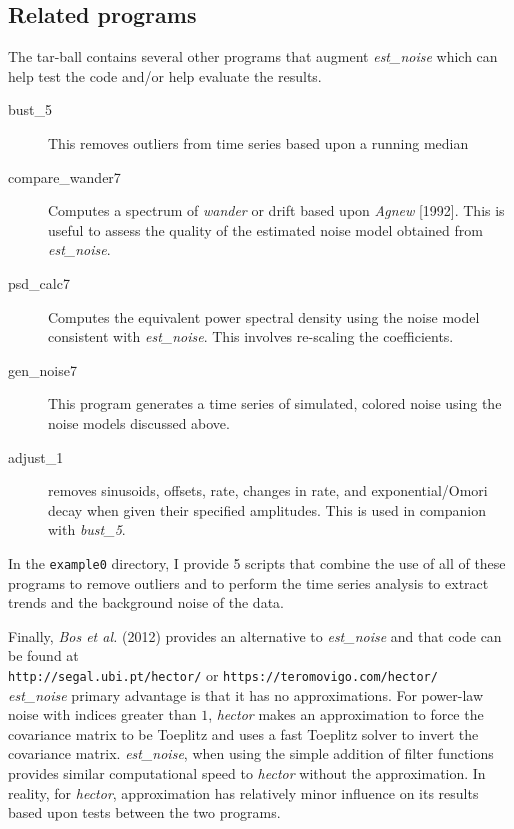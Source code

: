 \documentclass[12pt]{amsart}
\begin{document}
\subsection{Related programs}

The tar-ball contains several other programs that augment \textit{est\_noise} which can help test the code and/or help evaluate the results.
\begin{description}
\item[bust\_5]  This removes outliers from time series based upon a running median
\item[compare\_wander7]  Computes a spectrum of \textit{wander} or drift based upon \textit{Agnew} [1992]. This is
useful to assess the quality of the estimated noise model obtained from \textit{est\_noise}.  
\item[psd\_calc7] Computes the equivalent power spectral density using the noise model consistent with \textit{est\_noise}.
This involves re-scaling the coefficients.
\item[gen\_noise7] This program generates a time series of simulated, colored noise using the noise models discussed
above.
\item[adjust\_1]  removes sinusoids, offsets, rate, changes in rate, and exponential/Omori decay when given their
specified amplitudes. This is used in companion with \textit{bust\_5}.
\end{description}

In the \texttt{example0} directory, I provide 5 scripts that combine the use of all of these programs to remove outliers
and to perform the time series analysis to extract trends and the background noise of the data. 

Finally, \textit{Bos et al.} (2012) provides an alternative to \textit{est\_noise} and that code can be found
at
\\
\texttt{http://segal.ubi.pt/hector/} or \texttt{https://teromovigo.com/hector/}
\\
\textit{est\_noise} primary advantage is that it has no approximations.  For power-law noise with indices greater than $1$,
\textit{hector} makes an approximation to force the covariance matrix to be Toeplitz and uses a fast Toeplitz solver
to invert the covariance matrix. \textit{est\_noise}, when using the simple addition of filter functions provides similar computational
speed to \textit{hector} without the approximation. In reality, for \textit{hector}, approximation has relatively minor influence on
its results based upon tests between the two programs.
\end{document}
